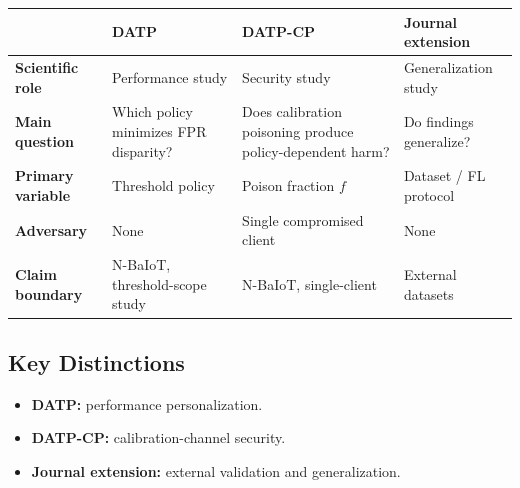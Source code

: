 \vspace{0.3em}
\begin{tabularx}{\linewidth}{@{} >{\bfseries\small}p{3.2cm}
                                    >{\small}X
                                    >{\small}X
                                    >{\small}X @{}}
\toprule
\normalfont & \textbf{DATP} & \textbf{DATP-CP} & \textbf{Journal extension}\\
\midrule
Scientific role
  & Performance study
  & Security study
  & Generalization study\\[4pt]
Main question
  & Which policy minimizes FPR disparity?
  & Does calibration poisoning produce policy-dependent harm?
  & Do findings generalize?\\[4pt]
Primary variable
  & Threshold policy
  & Poison fraction $f$
  & Dataset / FL protocol\\[4pt]
Adversary
  & None
  & Single compromised client
  & None\\[4pt]
Claim boundary
  & N-BaIoT, threshold-scope study
  & N-BaIoT, single-client
  & External datasets\\
\bottomrule
\end{tabularx}
\vspace{0.3em}

\subsection{Key Distinctions}

\begin{itemize}
  \item \textbf{DATP:} performance personalization.
  \item \textbf{DATP-CP:} calibration-channel security.
  \item \textbf{Journal extension:} external validation and generalization.
\end{itemize}

\clearpage
